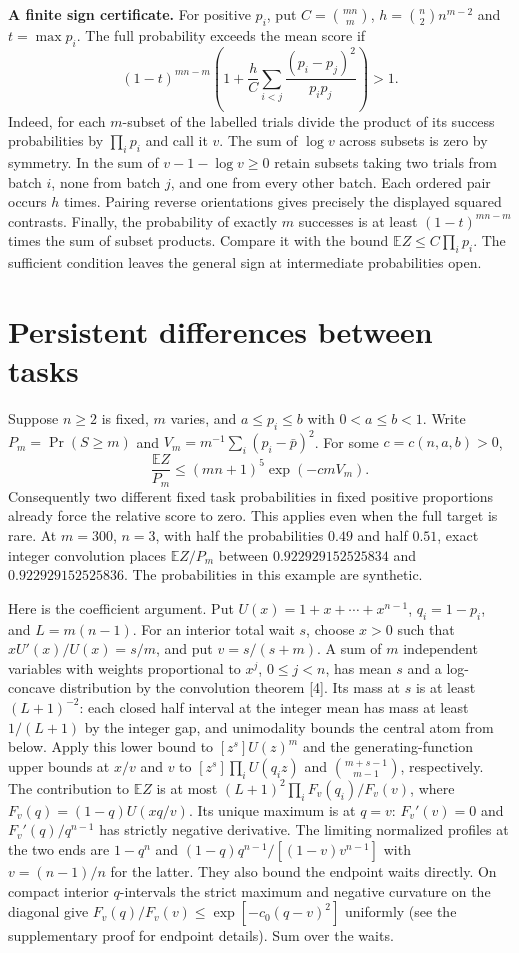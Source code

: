 \documentclass[11pt]{article}
\begin{document}
\textbf{A finite sign certificate.} For positive $p_i$, put $C=\binom{mn}{m}$, $h=\binom{n}{2}n^{m-2}$ and $t=\max p_i$. The full probability exceeds the mean score if
\[
(1-t)^{mn-m}\left(1+\frac{h}{C}\sum_{i<j}\frac{(p_i-p_j)^2}{p_i p_j}\right)>1 .
\]
Indeed, for each $m$-subset of the labelled trials divide the product of its success probabilities by $\prod_i p_i$ and call it $v$. The sum of $\log v$ across subsets is zero by symmetry. In the sum of $v-1-\log v\ge0$ retain subsets taking two trials from batch $i$, none from batch $j$, and one from every other batch. Each ordered pair occurs $h$ times. Pairing reverse orientations gives precisely the displayed squared contrasts. Finally, the probability of exactly $m$ successes is at least $(1-t)^{mn-m}$ times the sum of subset products. Compare it with the bound $\mathbb E Z\le C\prod_i p_i$. The sufficient condition leaves the general sign at intermediate probabilities open.


\newpage
\section*{Persistent differences between tasks}
Suppose $n\ge2$ is fixed, $m$ varies, and $a\le p_i\le b$ with $0<a\le b<1$. Write $P_m=\Pr(S\ge m)$ and $V_m=m^{-1}\sum_i(p_i-\bar p)^2$. For some $c=c(n,a,b)>0$,
\[
\frac{\mathbb E Z}{P_m}\le(mn+1)^5\exp(-cmV_m).
\]
Consequently two different fixed task probabilities in fixed positive proportions already force the relative score to zero. This applies even when the full target is rare. At $m=300$, $n=3$, with half the probabilities $0.49$ and half $0.51$, exact integer convolution places $\mathbb E Z/P_m$ between $0.922929152525834$ and $0.922929152525836$. The probabilities in this example are synthetic.

Here is the coefficient argument. Put $U(x)=1+x+\cdots+x^{n-1}$, $q_i=1-p_i$, and $L=m(n-1)$. For an interior total wait $s$, choose $x>0$ such that $xU'(x)/U(x)=s/m$, and put $v=s/(s+m)$. A sum of $m$ independent variables with weights proportional to $x^j$, $0\le j<n$, has mean $s$ and a log-concave distribution by the convolution theorem [4]. Its mass at $s$ is at least $(L+1)^{-2}$: each closed half interval at the integer mean has mass at least $1/(L+1)$ by the integer gap, and unimodality bounds the central atom from below. Apply this lower bound to $[z^s]U(z)^m$ and the generating-function upper bounds at $x/v$ and $v$ to $[z^s]\prod_i U(q_i z)$ and $\binom{m+s-1}{m-1}$, respectively. The contribution to $\mathbb E Z$ is at most $(L+1)^2\prod_i F_v(q_i)/F_v(v)$, where $F_v(q)=(1-q)U(xq/v)$. Its unique maximum is at $q=v$: $F_v'(v)=0$ and $F_v'(q)/q^{n-1}$ has strictly negative derivative. The limiting normalized profiles at the two ends are $1-q^n$ and $(1-q)q^{n-1}/[(1-v)v^{n-1}]$ with $v=(n-1)/n$ for the latter. They also bound the endpoint waits directly. On compact interior $q$-intervals the strict maximum and negative curvature on the diagonal give $F_v(q)/F_v(v)\le\exp[-c_0(q-v)^2]$ uniformly (see the supplementary proof for endpoint details). Sum over the waits.
\end{document}
